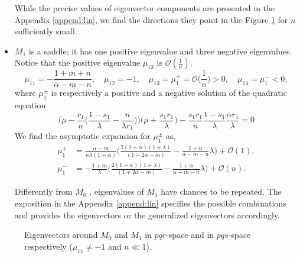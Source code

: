\documentclass[a4paper,11pt]{article}
\def\BO{{\mathcal{O}}}
\begin{document}
\begin{itemize}
 While the precise values of eigenvector components are presented in the Appendix \ref{append:lin}, we find the directions they point in the Figure \ref{fig:equilibria} for $n$ sufficiently small.
 \item $M_1$ is a saddle; it has one positive eigenvalue and three negative eigenvalues. Notice that the positive eigenvalue $\mu_{13}$ is $\mathcal{O}( \frac{1}{n})$. 
\begin{equation}
 \mu_{11}=-\frac{1+m+n}{\alpha-m-n}, \quad \mu_{12}=-1, \quad \mu_{13}=\mu_1^+=\BO\Big(\frac{1}{n}\Big)>0, \quad \mu_{14}=\mu_1^{-}<0,
\end{equation}
where $\mu_1^\pm$ is respectively a positive and a negative solution of the quadratic equation
 $$ \Big(\mu - \frac{r_1}{n}\Big(\frac{1-s_1}{\lambda}-\frac{n}{\lambda r_1}\Big)\Big)\Big(\mu + \frac{s_1r_1}{\lambda}\Big) - \frac{s_1r_1}{n} \frac{1-s_1}{\lambda}\frac{\alpha r_1}{\lambda} = 0$$
We find the asymptotic expansion for $\mu_1^\pm$ as,
\begin{align*}
\mu_1^+ &= \frac{\alpha-m}{n\lambda(1+\alpha)}\Big(\frac{2(1+\alpha)(1+\lambda)}{(1+2\alpha-m) } - \frac{1+\alpha}{\alpha-m-n}\lambda\Big) + \BO(1), \\
\mu_1^- &= -\frac{1+m}{\lambda}\Big(\frac{2(1+\alpha)(1+\lambda)}{(1+2\alpha-m) } - \frac{1+\alpha}{\alpha-m-n}\lambda\Big) + \BO(n).
\end{align*}

Differently from $M_0$ , eigenvalues of $M_1$ have chances to be repeated. The exposition in the Appendix \ref{append:lin} specifies the possible combinations and provides the eigenvectors or the generalized eigenvectors accordingly.
\end{itemize}
\begin{figure}
 \centering
  \subfigure[$pqr$-space]{
  \psfrag{r}{\scriptsize$r$}%
  \texttt{[image: equilibriapqr.eps]}\label{fig:eq1}
  }
  \quad \quad
  \subfigure[$pqs$-space]{
  \psfrag{r}{\scriptsize$s-\frac{1+m}{1+\alpha}$}%
  \texttt{[image: equilibriapqs.eps]}\label{fig:eq2}
  }
  \caption{Eigenvectors around $M_0$ and $M_1$ in $pqr$-space and in $pqs$-space respectively ($\mu_{11}\ne-1$ and $n\ll1$). } \label{fig:equilibria}
\end{figure}
\end{document}
